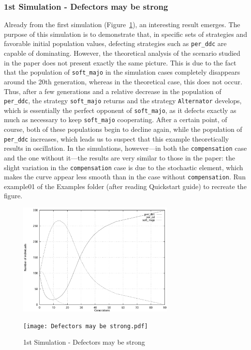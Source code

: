 \subsubsection{1st Simulation - Defectors may be strong}
Already from the first simulation (Figure~\ref{fig:Defectors may be strong}), an interesting result emerges. The purpose of this simulation is to demonstrate that, in specific sets of strategies and favorable initial population values, defecting strategies such as \texttt{per\_ddc} are capable of dominating. However, the theoretical analysis of the scenario studied in the paper does not present exactly the same picture. This is due to the fact that the population of \texttt{soft\_majo} in the simulation cases completely disappears around the 20th generation, whereas in the theoretical case, this does not occur. Thus, after a few generations and a relative decrease in the population of \texttt{per\_ddc}, the strategy \texttt{soft\_majo} returns and the strategy \texttt{Alternator} develops, which is essentially the perfect opponent of \texttt{soft\_majo}, as it defects exactly as much as necessary to keep \texttt{soft\_majo} cooperating. After a certain point, of course, both of these populations begin to decline again, while the population of \texttt{per\_ddc} increases, which leads us to suspect that this example theoretically results in oscillation. In the simulations, however---in both the \texttt{compensation} case and the one without it---the results are very similar to those in the paper: the slight variation in the \texttt{compensation} case is due to the stochastic element, which makes the curve appear less smooth than in the case without \texttt{compensation}. Run example01 of the Examples folder (after reading Quickstart guide) to recreate the figure.

	\begin{figure}[h]
		\centering
		\includegraphics[width=0.7\textwidth]{RefPaperFigures/fig1.jpeg}\par\vspace{0.5em}
		\texttt{[image: Defectors may be strong.pdf]}
	    \caption{1st Simulation - Defectors may be strong}
	    \label{fig:Defectors may be strong}
	\end{figure}
